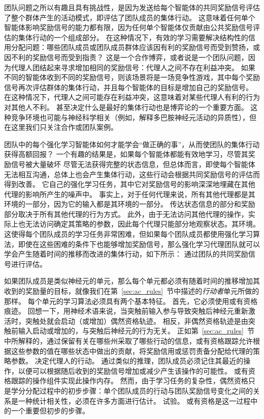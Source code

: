团队问题之所以有趣且具有挑战性，是因为发送给每个智能体的共同奖励信号评估了整个群体产生的活动模式，即评估了团队成员的集体行动。
这意味着任何单个智能体影响奖励信号的能力都有限，因为任何单个智能体仅贡献由公共奖励信号评估的集体行动的一个组成部分。
在这种情况下，有效的学习需要解决结构性的信用分配问题：哪些团队成员或团队成员群体应该因有利的奖励信号而受到赞扬，或因不利的奖励信号而受到指责？
这是一个合作博弈，或者说是一个团队问题，因为代理人团结起来寻求增加相同的奖励信号：代理人之间不存在利益冲突。
如果不同的智能体收到不同的奖励信号，则该场景将是一场竞争性游戏，其中每个奖励信号再次评估群体的集体行动，并且每个智能体的目标是增加自己的奖励信号。
在这种情况下，代理人之间可能存在利益冲突，这意味着对某些代理人有利的行为对其他人不利。
甚至决定什么是最好的集体行动也是博弈论的一个重要方面。
这种竞争环境也可能与神经科学相关（例如，解释多巴胺神经元活动的异质性），但在这里我们只关注合作或团队案例。


团队中的每个强化学习智能体如何才能学会“做正确的事”，从而使团队的集体行动获得高额回报？
一个有趣的结果是，如果每个智能体都能有效地学习，尽管其奖励信号被大量破坏 尽管无法获得完整的状态信息，但总体而言，即使每个智能体无法相互沟通，总体上也会产生集体行动，这些行动会根据共同奖励信号的评估而得到改善。
它自己的强化学习任务，其中它对奖励信号的影响深深地埋藏在其他代理的影响所产生的噪声中。
事实上，对于任何代理来说，所有其他代理都是其环境的一部分，因为它的输入都是其环境的一部分。
传达状态信息的部分和奖励部分取决于所有其他代理的行为方式。
此外，由于无法访问其他代理的操作，实际上也无法访问确定其策略的参数，因此每个代理只能部分地观察状态。其环境。
这使得每个团队成员的学习任务非常困难，但如果每个团队成员都使用强化学习算法，即使在这些困难的条件下也能够增加奖励信号，那么强化学习代理团队就可以学会产生随着时间的推移而改进的集体行动，如下所示： 通过团队的共同奖励信号进行评估。


如果团队成员是类似神经元的单元，那么每个单元都必须有随着时间的推移增加其收到的奖励量的目标，就像我们在第~\ref{sec:ac_rules}~节中描述的\textit{行动者}单元所做的那样。
每个单元的学习算法必须具有两个基本特征。
首先，它必须使用或有资格痕迹。
回想一下，用神经术语来说，当突触前输入参与导致突触后神经元重新激活时，突触处就会启动（或增加）偶然资格轨迹。
相反，非偶然资格轨迹是由突触前输入启动或增加的，与突触后神经元的行为无关。
正如第~\ref{sec:ac_rules}~节中所解释的，通过保留有关在哪些州采取了哪些行动的信息，或有资格跟踪允许根据这些参数的值在哪些状态中做出的贡献，将奖励信用或惩罚责备分配给代理的策略参数。
决定代理人的行动。
通过类似的推理，团队成员必须记住其最近的操作，以便可以根据随后收到的奖励信号增加或减少产生该操作的可能性。
或有资格跟踪的操作组件实现此操作内存。
然而，由于学习任务的复杂性，偶然资格只是学分分配过程中的初步步骤：单个团队成员的行动与团队奖励信号变化之间的关系是一种统计相关性，必须在许多方面进行估计。
试验。
或有资格是这一过程中的一个重要但初步的步骤。


